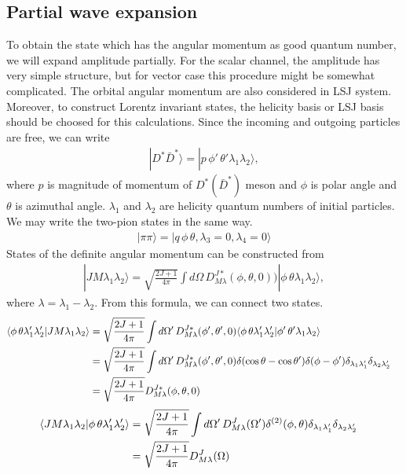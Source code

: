 \documentclass[aps,prd,preprintnumbers,showpacs,showkeys,nofootinbib,
superscriptaddress,fleqn,floatfix,tightenlines, 10pt]{revtex4-1}
\begin{document}
\subsection{Partial wave expansion}
To obtain the state which has the angular momentum as good quantum number, we will expand amplitude partially.
For the scalar channel, the amplitude has very simple structure, but for vector case this procedure might be
somewhat complicated. The orbital angular momentum are also considered in LSJ system.
Moreover, to construct Lorentz invariant states, the helicity basis or LSJ basis should be choosed for this
calculations.
Since the incoming and outgoing particles are free, we can write
\begin{align}
	|D^* \bar{D}^* \rangle = | p\,\phi'\,\theta'\lambda_1 \lambda_2 \rangle,
\end{align}
where $p$ is magnitude of momentum of $D^*(\bar{D}^*)$ meson and $\phi$ is polar angle and $\theta$ is azimuthal angle.
$\lambda_1$ and $\lambda_2$ are helicity quantum numbers of initial particles. We may write the two-pion states in the same way.
\begin{align}
	|\pi \pi \rangle = | q\,\phi\,\theta,\lambda_3=0, \lambda_4=0 \rangle
\end{align}
States of the definite angular momentum can be constructed from
\begin{align}
	|J M \lambda_1 \lambda_2 \rangle = \sqrt{\frac{2J+1}{4\pi}} \int{d\Omega \, D^{J*}_{M \lambda} (\phi, \theta, 0))}
	|\phi\,\theta \lambda_1 \lambda_2 \rangle,
\end{align}
where $\lambda = \lambda_1 - \lambda_2$. From this formula, we can connect two states.
\begin{align}
	\langle \phi\,\theta \lambda'_1 \lambda'_2 |J M \lambda_1 \lambda_2 \rangle &= \sqrt{\frac{2J+1}{4\pi}}
	\int{d\Omega' \, D^{J*}_{M \lambda} (\phi', \theta', 0)}
	\langle \phi\,\theta \lambda'_1 \lambda'_2 |\phi'\,\theta' \lambda_1 \lambda_2 \rangle \cr
	&= \sqrt{\frac{2J+1}{4\pi}} \int{d\Omega' \, D^{J*}_{M \lambda} (\phi', \theta', 0)
	\delta(\cos{\theta} - \cos{\theta'}) \delta(\phi - \phi')
	\delta_{\lambda_1 \lambda'_1} \delta_{\lambda_2 \lambda'_2}} \cr
	&= \sqrt{\frac{2J+1}{4\pi}} D^{J*}_{M \lambda} (\phi, \theta, 0)
\end{align}
\begin{align}
	\langle JM\lambda_1\lambda_2|\phi\,\theta\lambda_1'\lambda_2'\rangle
	&= \sqrt{\frac{2J+1}{4\pi}} \int d\Omega'\, D_{M\lambda}^J(\Omega')
	\delta^{(2)}(\phi,\theta) \delta_{\lambda_1 \lambda_1'} \delta_{\lambda_2 \lambda_2'} \cr
	&=  \sqrt{\frac{2J+1}{4\pi}} D_{M\lambda}^J(\Omega)
\end{align}
\end{document}
